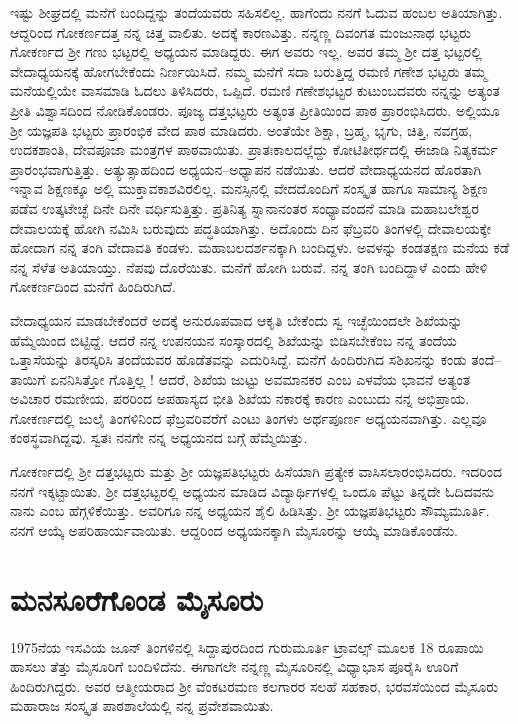 ಇಷ್ಟು ಶೀಘ್ರದಲ್ಲಿ ಮನೆಗೆ ಬಂದಿದ್ದನ್ನು ತಂದೆಯವರು ಸಹಿಸಲಿಲ್ಲ. ಹಾಗೆಂದು ನನಗೆ ಓದುವ ಹಂಬಲ ಅತಿಯಾಗಿತ್ತು.  ಆದ್ದರಿಂದ ಗೋಕರ್ಣದತ್ತ ನನ್ನ ಚಿತ್ತ ವಾಲಿತು.  ಅದಕ್ಕೆ ಕಾರಣವಿತ್ತು.  ನನ್ನಣ್ಣ ದಿವಂಗತ ಮಂಜುನಾಥ ಭಟ್ಟರು ಗೋಕರ್ಣದ ಶ್ರೀ ಗಣು ಭಟ್ಟರಲ್ಲಿ ಅಧ್ಯಯನ ಮಾಡಿದ್ದರು. ಈಗ ಅವರು ಇಲ್ಲ.  ಅವರ ತಮ್ಮ ಶ್ರೀ ದತ್ತ ಭಟ್ಟರಲ್ಲಿ ವೇದಾಧ್ಯಯನಕ್ಕೆ ಹೋಗಬೇಕೆಂದು ನಿರ್ಣಯಿಸಿದೆ.  ನಮ್ಮ ಮನೆಗೆ ಸದಾ ಬರುತ್ತಿದ್ದ ರಮಣಿ ಗಣೇಶ ಭಟ್ಟರು ತಮ್ಮ ಮನೆಯಲ್ಲಿಯೇ ವಾಸಮಾಡಿ ಓದಲು ತಿಳಿಸಿದರು,  ಒಪ್ಪಿದೆ.  ರಮಣಿ ಗಣೇಶಭಟ್ಟರ ಕುಟುಂಬದವರು ನನ್ನನ್ನು ಅತ್ಯಂತ ಪ್ರೀತಿ ವಿಶ್ವಾಸದಿಂದ ನೋಡಿಕೊಂಡರು.  ಪೂಜ್ಯ ದತ್ತಭಟ್ಟರು ಅತ್ಯಂತ ಪ್ರೀತಿಯಿಂದ ಪಾಠ ಪ್ರಾರಂಭಿಸಿದರು.  ಅಲ್ಲಿಯೂ ಶ್ರೀ ಯಜ್ಞಪತಿ ಭಟ್ಟರು ಪ್ರಾರಂಭಿಕ ವೇದ ಪಾಠ ಮಾಡಿದರು.  ಅಂತೆಯೇ ಶಿಕ್ಷಾ, ಬ್ರಹ್ಮ, ಭೃಗು, ಚಿತ್ತಿ, ನವಗ್ರಹ, ಉದಕಶಾಂತಿ, ದೇವಪೂಜಾ ಮಂತ್ರಗಳ ಪಾಠವಾಯಿತು.  ಪ್ರಾತಃಕಾಲದಲ್ಲೆದ್ದು ಕೋಟಿತೀರ್ಥದಲ್ಲಿ ಈಜಾಡಿ ನಿತ್ಯಕರ್ಮ ಪ್ರಾರಂಭವಾಗುತ್ತಿತ್ತು.  ಅತ್ಯುತ್ಸಾಹದಿಂದ ಅಧ್ಯಯನ–ಅಧ್ಯಾಪನ ನಡೆಯಿತು.  ಆದರೆ ವೇದಾಧ್ಯಯನದ ಹೊರತಾಗಿ ಇನ್ನಾವ ಶಿಕ್ಷಣಕ್ಕೂ ಅಲ್ಲಿ ಮುಕ್ತಾವಕಾಶವಿರಲಿಲ್ಲ.  ಮನಸ್ಸಿನಲ್ಲಿ ವೇದದೊಂದಿಗೆ ಸಂಸ್ಕೃತ ಹಾಗೂ ಸಾಮಾನ್ಯ ಶಿಕ್ಷಣ ಪಡೆವ ಉತ್ಕಟೇಚ್ಛೆ ದಿನೇ ದಿನೇ ವರ್ಧಿಸುತ್ತಿತ್ತು.  ಪ್ರತಿನಿತ್ಯ ಸ್ನಾನಾನಂತರ ಸಂಧ್ಯಾವಂದನೆ ಮಾಡಿ ಮಹಾಬಲೇಶ್ವರ ದೇವಾಲಯಕ್ಕೆ ಹೋಗಿ ನಮಿಸಿ ಬರುವುದು ಪದ್ಧತಿಯಾಗಿತ್ತು.  ಅದೊಂದು ದಿನ ಫೆಬ್ರವರಿ ತಿಂಗಳಲ್ಲಿ ದೇವಾಲಯಕ್ಕೇ ಹೋದಾಗ ನನ್ನ ತಂಗಿ ವೇದಾವತಿ ಕಂಡಳು.  ಮಹಾಬಲದರ್ಶನಕ್ಕಾಗಿ ಬಂದಿದ್ದಳು.  ಅವಳನ್ನು ಕಂಡತಕ್ಷಣ ಮನೆಯ ಕಡೆ ನನ್ನ ಸೆಳೆತ ಅತಿಯಾಯ್ತು.  ನೆಪವು ದೊರೆಯಿತು.  ಮನೆಗೆ ಹೋಗಿ ಬರುವೆ. ನನ್ನ ತಂಗಿ ಬಂದಿದ್ದಾಳೆ ಎಂದು ಹೇಳಿ ಗೋಕರ್ಣದಿಂದ ಮನೆಗೆ ಹಿಂದಿರುಗಿದೆ.  

ವೇದಾಧ್ಯಯನ ಮಾಡಬೇಕೆಂದರೆ ಅದಕ್ಕೆ ಅನುರೂಪವಾದ ಆಕೃತಿ ಬೇಕೆಂದು ಸ್ವ ಇಚ್ಛೆಯಿಂದಲೇ ಶಿಖೆಯನ್ನು ಹೆಮ್ಮೆಯಿಂದ ಬಿಟ್ಟಿದ್ದೆ.  ಆದರೆ ನನ್ನ ಉಪನಯನ ಸಂಸ್ಕಾರದಲ್ಲಿ ಶಿಖೆಯನ್ನು ಬಿಡಿಸಬೇಕೆಂಬ ನನ್ನ ತಂದೆಯ ಒತ್ತಾಸೆಯನ್ನು ತಿರಸ್ಕರಿಸಿ ತಂದೆಯವರ ಹೊಡೆತವನ್ನು ಎದುರಿಸಿದ್ದೆ.  ಮನೆಗೆ ಹಿಂದಿರುಗಿದ ಸಶಿಖನನ್ನು ಕಂಡು ತಂದೆ–ತಾಯಿಗೆ ಏನನಿಸಿತ್ತೋ ಗೊತ್ತಿಲ್ಲ !  ಆದರೆ, ಶಿಖೆಯ ಜುಟ್ಟು ಅವಮಾನಕರ ಎಂಬ ಎಳವೆಯ ಭಾವನೆ ಅತ್ಯಂತ ಅವಿಚಾರ ರಮಣೀಯ. ಪರರಿಂದ ಅಪಹಾಸ್ಯದ ಭೀತಿ ಶಿಖೆಯ ನಕಾರಕ್ಕೆ ಕಾರಣ ಎಂಬುದು ನನ್ನ ಅಭಿಪ್ರಾಯ.  ಗೋಕರ್ಣದಲ್ಲಿ ಜುಲೈ ತಿಂಗಳಿನಿಂದ ಫೆಬ್ರವರಿವರೆಗೆ ಎಂಟು ತಿಂಗಳು ಅರ್ಥಪೂರ್ಣ ಅಧ್ಯಯನವಾಗಿತ್ತು.  ಎಲ್ಲವೂ ಕಂಠಸ್ಥವಾಗಿದ್ದವು.  ಸ್ವತಃ ನನಗೇ ನನ್ನ ಅಧ್ಯಯನದ ಬಗ್ಗೆ ಹೆಮ್ಮೆಯಿತ್ತು.

ಗೋಕರ್ಣದಲ್ಲಿ ಶ್ರೀ ದತ್ತಭಟ್ಟರು ಮತ್ತು ಶ್ರೀ ಯಜ್ಞಪತಿಭಟ್ಟರು ಹಿಸೆಯಾಗಿ ಪ್ರತ್ಯೇಕ ವಾಸಿಸಲಾರಂಭಿಸಿದರು.  ಇದರಿಂದ ನನಗೆ ಇಕ್ಕಟ್ಟಾಯಿತು. ಶ್ರೀ ದತ್ತಭಟ್ಟರಲ್ಲಿ ಅಧ್ಯಯನ ಮಾಡಿದ ವಿದ್ಯಾರ್ಥಿಗಳಲ್ಲಿ ಒಂದೂ ಪೆಟ್ಟು ತಿನ್ನದೇ ಓದಿದವನು ನಾನು ಎಂಬ ಹೆಗ್ಗಳಿಕೆಯಿತ್ತು.  ಅವರಿಗೂ ನನ್ನ ಅಧ್ಯಯನ ಶೈಲಿ ಹಿಡಿಸಿತ್ತು.  ಶ್ರೀ ಯಜ್ಞಪತಿಭಟ್ಟರು ಸೌಮ್ಯಮೂರ್ತಿ. ನನಗೆ ಆಯ್ಕೆ ಅಪರಿಹಾರ್ಯವಾಯಿತು.  ಆದ್ದರಿಂದ ಅಧ್ಯಯನಕ್ಕಾಗಿ ಮೈಸೂರನ್ನು ಆಯ್ಕೆ ಮಾಡಿಕೊಂಡೆನು.

\section*{ಮನಸೂರೆಗೊಂಡ ಮೈಸೂರು}

1975ನೆಯ ಇಸವಿಯ ಜೂನ್ ತಿಂಗಳಿನಲ್ಲಿ ಸಿದ್ದಾಪುರದಿಂದ ಗುರುಮೂರ್ತಿ ಟ್ರಾವಲ್ಸ್ ಮೂಲಕ 18 ರೂಪಾಯಿ ಹಾಸಲು ತೆತ್ತು ಮೈಸೂರಿಗೆ ಬಂದಿಳಿದೆನು. ಈಗಾಗಲೇ ನನ್ನಣ್ಣ ಮೈಸೂರಿನಲ್ಲಿ ವಿಧ್ಯಾಭಾಸ ಪೂರೈಸಿ ಊರಿಗೆ ಹಿಂದಿರುಗಿದ್ದರು.  ಅವರ ಆತ್ಮೀಯರಾದ ಶ್ರೀ ವೆಂಕಟರಮಣ ಕಲಗಾರರ ಸಲಹೆ ಸಹಕಾರ, ಭರವಸೆಯಿಂದ ಮೈಸೂರು ಮಹಾರಾಜ ಸಂಸ್ಕೃತ ಪಾಠಶಾಲೆಯಲ್ಲಿ ನನ್ನ ಪ್ರವೇಶವಾಯಿತು.

